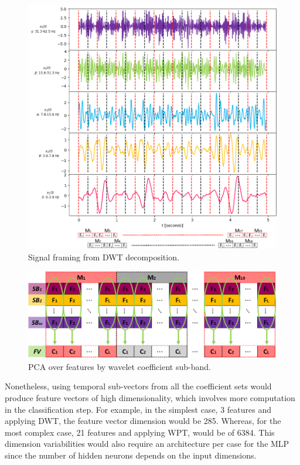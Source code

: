 \begin{figure}[h!]
\includegraphics[width=\linewidth]{Figures/DWT_Framing.png}
\centering
\caption{Signal framing from DWT decomposition.}
\label{Fig: DWT_Framing}
\end{figure}

\begin{figure}[h!]
\includegraphics[width=\linewidth]{Figures/PCA.png}
\centering
\caption{PCA over features by wavelet coefficient sub-band.}
\label{Fig: PCA}
\end{figure}

Nonetheless, using temporal sub-vectors from all the coefficient sets would produce feature vectors of high dimensionality, which involves more computation in the classification step. For example, in the simplest case, 3 features and applying DWT, the feature vector dimension would be 285. Whereas, for the most complex case, 21 features and applying WPT, would be of 6384. This dimension variabilities would also require an architecture per case for the MLP since the number of hidden neurons depends on the input dimensions.\\

